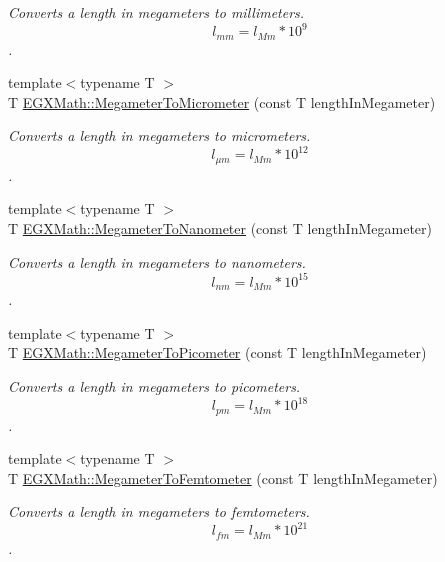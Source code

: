 \begin{DoxyCompactItemize}
\begin{DoxyCompactList}\small\item\em Converts a length in megameters to millimeters. \[ l_{mm}=l_{Mm} * 10^{9} \]. \end{DoxyCompactList}\item 
{\footnotesize template$<$typename T $>$ }\\T \mbox{\hyperlink{group___e_g_x_math-_conversions-_length_conversions-_s_i-_megameter-_s_i_ga4b0dc1e6dd503c23428038a69ff07146}{E\+G\+X\+Math\+::\+Megameter\+To\+Micrometer}} (const T length\+In\+Megameter)
\begin{DoxyCompactList}\small\item\em Converts a length in megameters to micrometers. \[ l_{\mu m}=l_{Mm} * 10^{12} \]. \end{DoxyCompactList}\item 
{\footnotesize template$<$typename T $>$ }\\T \mbox{\hyperlink{group___e_g_x_math-_conversions-_length_conversions-_s_i-_megameter-_s_i_ga4b35e7fac8eeb2e9e6db36a4c63e3073}{E\+G\+X\+Math\+::\+Megameter\+To\+Nanometer}} (const T length\+In\+Megameter)
\begin{DoxyCompactList}\small\item\em Converts a length in megameters to nanometers. \[ l_{nm}=l_{Mm} * 10^{15} \]. \end{DoxyCompactList}\item 
{\footnotesize template$<$typename T $>$ }\\T \mbox{\hyperlink{group___e_g_x_math-_conversions-_length_conversions-_s_i-_megameter-_s_i_ga0f6585bdcd16b6748b6c4d9116dd955c}{E\+G\+X\+Math\+::\+Megameter\+To\+Picometer}} (const T length\+In\+Megameter)
\begin{DoxyCompactList}\small\item\em Converts a length in megameters to picometers. \[ l_{pm}=l_{Mm} * 10^{18} \]. \end{DoxyCompactList}\item 
{\footnotesize template$<$typename T $>$ }\\T \mbox{\hyperlink{group___e_g_x_math-_conversions-_length_conversions-_s_i-_megameter-_s_i_gad53a3da18100c2bb2d12ecb9178ae597}{E\+G\+X\+Math\+::\+Megameter\+To\+Femtometer}} (const T length\+In\+Megameter)
\begin{DoxyCompactList}\small\item\em Converts a length in megameters to femtometers. \[ l_{fm}=l_{Mm} * 10^{21} \]. \end{DoxyCompactList}\item 

\end{DoxyCompactItemize}
